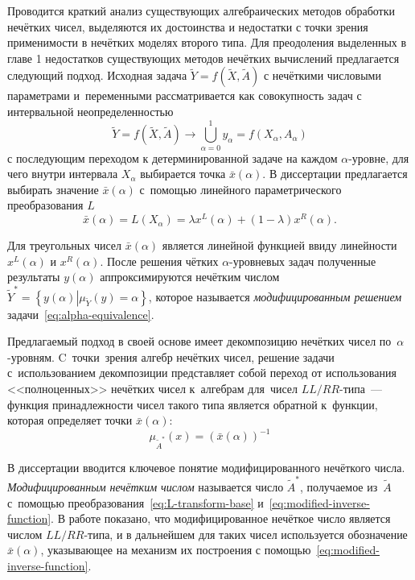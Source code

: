 Проводится краткий анализ существующих алгебраических методов обработки нечётких чисел, выделяются их достоинства и недостатки с точки зрения применимости в нечётких моделях второго типа. Для преодоления выделенных в главе 1 недостатков существующих методов нечётких вычислений предлагается следующий подход. Исходная задача $\tilde{Y}=f\left( \tilde{X}, \tilde A \right)$ с нечёткими числовыми параметрами и~переменными рассматривается как совокупность задач с интервальной неопределенностью
\begin{equation}
\label{eq:alpha-equivalence}
	\tilde{Y} = f\left( \tilde X, \tilde A \right)\to \bigcup\limits_{\alpha =0}^{1}{y_\alpha}=f\left( X_\alpha, A_\alpha \right)
\end{equation}
с последующим переходом к детерминированной задаче на каждом $\alpha$-уровне, для чего внутри интервала $X_\alpha$ выбирается точка $\bar{x}\left( \alpha  \right)$. В диссертации предлагается выбирать значение $\bar{x}\left( \alpha  \right)$ с~помощью линейного параметрического преобразования $L$
\begin{equation}
  \label{eq:L-transform-base}
  \bar{x}\left( \alpha  \right)=L\left( X_\alpha \right)=\lambda x^L \left( \alpha  \right)+\left( 1-\lambda  \right) x^R \left( \alpha  \right).
\end{equation}

Для треугольных чисел $\bar{x}\left( \alpha  \right)$ является линейной функцией ввиду линейности $x^L\left( \alpha  \right)$ и $x^R\left( \alpha  \right)$. После решения чётких $\alpha$-уровневых задач полученные результаты $y\left( \alpha  \right)$ аппроксимируются нечётким числом $\tilde Y^{*}=\left\{ y(\alpha )\left| \mu_{\tilde Y}(y)=\alpha \right. \right\}$, которое называется \textit{модифицированным решением} задачи~\eqref{eq:alpha-equivalence}.

Предлагаемый подход в своей основе имеет декомпозицию нечётких чисел по~$\alpha$-уровням. C~точки~зрения алгебр нечётких чисел, решение задачи с~использованием декомпозиции представляет собой переход от использования <<полноценных>> нечётких чисел к~алгебрам для~чисел $LL/RR$-типа~--- функция принадлежности чисел такого типа является обратной к~функции, которая определяет точки $\bar{x}\left(\alpha \right)$:
\begin{equation}
\label{eq:modified-inverse-function}
  \mu_{\tilde A^{*}}\left( x \right)={\left( \bar{x}\left( \alpha  \right) \right)}^{-1}
\end{equation}

В диссертации вводится ключевое понятие модифицированного нечёткого числа. \textit{Модифицированным нечётким числом} называется число $\tilde A^{*}$, получаемое из~$\tilde{A}$ с~помощью преобразования~\eqref{eq:L-transform-base} и~\eqref{eq:modified-inverse-function}. В работе показано, что модифицированное нечёткое число является числом $LL/RR$-типа, и в дальнейшем для таких чисел используется обозначение $\bar{x}\left( \alpha  \right)$, указывающее на механизм их построения с помощью~\eqref{eq:modified-inverse-function}.

